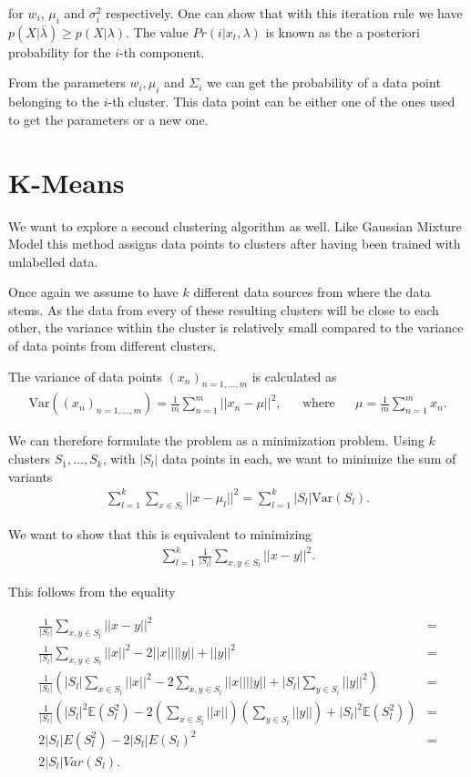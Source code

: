 for $w_i$, $\mu_i$ and $\sigma_i^2$ respectively. One can show that with this iteration rule we have $p(X|\bar{\lambda}) \geq p(X|\lambda)$. The value $Pr(i|x_t, \lambda)$ is known as the a posteriori probability for the $i$-th component.

From the parameters $w_i, \mu_i$ and $\Sigma_i$ we can get the probability of a data point belonging to the $i$-th cluster. This data point can be either one of the ones used to get the parameters or a new one.

\section{K-Means}

We want to explore a second clustering algorithm as well. Like Gaussian Mixture Model this method assigns data points to clusters after having been trained with unlabelled data.

Once again we assume to have $k$ different data sources from where the data stems. As the data from every of these resulting clusters will be close to each other, the variance within the cluster is relatively small compared to the variance of data points from different clusters.

The variance of data points $(x_n)_{n=1, ..., m}$ is calculated as
\begin{align*}
	\text{Var}((x_n)_{n=1, ..., m}) = \frac{1}{m} \sum_{n=1}^{m} ||x_n - \mu||^2, && \text{where} && \mu = \frac{1}{m} \sum_{n=1}^{m} x_n.
\end{align*}

We can therefore formulate the problem as a minimization problem. Using $k$ clusters $S_1, ..., S_k$, with $|S_l|$ data points in each, we want to minimize the sum of variants
\begin{align*}
	\sum_{l=1}^{k} \sum_{x \in S_l} ||x - \mu_l||^2 = \sum_{l=1}^{k} |S_l| \text{Var}(S_l).
\end{align*}

We want to show that this is equivalent to minimizing
\begin{align*}
	\sum_{l=1}^{k} \frac{1}{|S_l|} \sum_{x, y \in S_l} ||x-y||^2.
\end{align*}

This follows from the equality

\begin{align*}
	\frac{1}{|S_l|} \sum_{x, y \in S_l} ||x-y||^2 &=\\
	\frac{1}{|S_l|} \sum_{x, y \in S_l} ||x||^2 - 2||x|| ||y|| + ||y||^2 &=\\
	\frac{1}{|S_l|} \left(|S_l| \sum_{x\in S_l} ||x||^2 - 2\sum_{x, y \in S_l}||x|| ||y|| + |S_l| \sum_{y \in S_l}||y||^2\right) &=\\
	\frac{1}{|S_l|} (|S_l|^2 \mathds{E}(S_l^2) - 2\left(\sum_{x\in S_l}||x||\right)\left(\sum_{y \in S_l}||y||\right) + |S_l|^2 \mathds{E}(S_l^2)) &=\\
	2|S_l| E(S_l^2) - 2|S_l| E(S_l)^2 &=\\
	2 |S_l| Var(S_l).
\end{align*}


